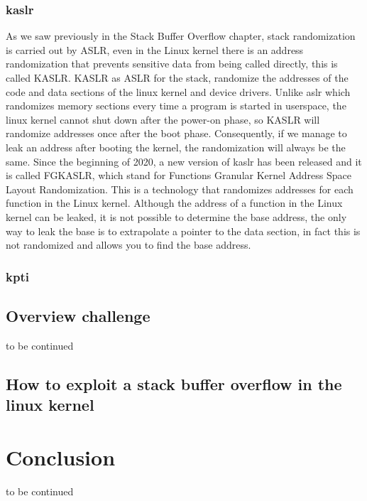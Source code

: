 \documentclass{report}
\begin{document}
    \subsection{kaslr}
    As we saw previously in the Stack Buffer Overflow chapter, stack randomization is carried out by ASLR, even in the Linux kernel there is an address randomization that prevents sensitive data from being called directly, this is called KASLR. \newline
    KASLR as ASLR for the stack, randomize the addresses  of the code and data sections of the linux kernel and device drivers.\newline
    Unlike aslr which randomizes memory sections every time a program is started in userspace, the linux kernel cannot shut down after the power-on phase, so KASLR will randomize addresses once after the boot phase.\newline
    Consequently, if we manage to leak an address after booting the kernel, the randomization will always be the same.\newline
    Since the beginning of 2020, a new version of kaslr has been released and it is called FGKASLR, which stand for Functions Granular Kernel Address Space Layout Randomization.\newline 
    This is a technology that randomizes addresses for each function in the Linux kernel.\newline 
    Although the address of a function in the Linux kernel can be leaked, it is not possible to determine the base address, the only way to leak the base is to extrapolate a pointer to the data section, in fact this is not randomized and allows you to find the base address.\newline

    \subsection{kpti}
    
    \section{Overview challenge}
    to be continued
    \clearpage
    \section{How to exploit a stack buffer overflow in the linux kernel }
    \chapter{Conclusion}
    to be continued
\end{document}
